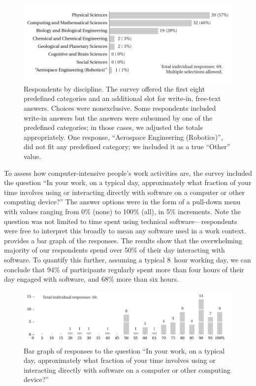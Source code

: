 \documentclass{casicswhitepaper}
\begin{document}
\begin{figure}[h]
  \vspace*{-1ex}
  \centering
  \includegraphics{files/plots/respondents-by-discipline.pdf}
  \vspace*{-3.5ex}
  \caption{Respondents by discipline.  The survey offered the first eight predefined categories and an additional slot for write-in, free-text answers.  Choices were nonexclusive.  Some respondents included write-in answers but the answers were subsumed by one of the predefined categories; in those cases, we adjusted the totals appropriately.  One response, ``Aerospace Engineering (Robotics)'', did not fit any predefined category; we included it as a true ``Other'' value.}
  \label{disciplines}
\end{figure}

To assess how computer-intensive people's work activities are, the survey included the question ``In your work, on a typical day, approximately what fraction of your time involves using or interacting directly with software on a computer or other computing device?''  The answer options were in the form of a pull-down menu with values ranging from 0\% (none) to 100\% (all), in 5\% increments.  Note the question was not limited to time spent using technical software---respondents were free to interpret this broadly to mean any software used in a work context.   provides a bar graph of the responses.  The results show that the overwhelming majority of our respondents spend over 50\% of their day interacting with software.  To quantify this further, assuming a typical 8~hour working day, we can conclude that 94\% of participants regularly spent more than four hours of their day engaged with software, and 68\% more than six hours.

\begin{figure}[bth]
  \centering
  \includegraphics{files/plots/bar-graph-time-spent-with-software.pdf}
  \vspace*{-4.5ex}
  \caption{Bar graph of responses to the question ``In your work, on a
    typical day, approximately what fraction of your time involves using or
    interacting directly with software on a computer or other computing
    device?''}
  \label{time-with-software}
\end{figure}
\end{document}
